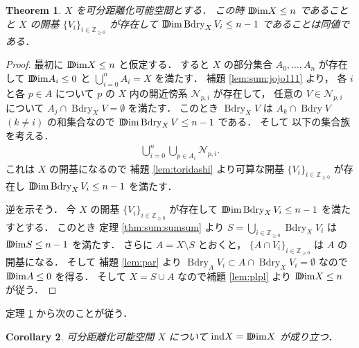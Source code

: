 \documentclass[leqno, a4paper, 12pt]{jsarticle}
\theoremstyle{plain}
\newtheorem{thm}{Theorem}[section]
\newtheorem{cor}[thm]{Corollary}
\theoremstyle{definition}
\theoremstyle{remark}
\newcommand{\zz}{\mathbb{Z}}
\DeclareMathOperator{\bd}{\mathrm{Bdry}}
\newcommand{\yoind}{\mathrm{ind}}
\newcommand{\yoddim}{\mathrm{D\hspace{-5.5pt}Dim}}
\numberwithin{equation}{section}
\begin{document}
\begin{thm}\label{thm:boundary}
$X$
を可分距離化可能空間とする．
この時
$\yoddim X\le n$
であることと
$X$
の開基
$\{V_{i}\}_{i\in \zz_{\ge 0}}$
が存在して
$\yoddim\bd_{X} V_{i}\le n-1$
であることは同値である．
\end{thm}
\begin{proof}
最初に
$\yoddim X\le n$
と仮定する．
すると
$X$
の部分集合
$A_{0}, \dots, A_{n}$
が存在して
$\yoddim A_{i}\le 0$
と
$\bigcup_{i=0}^{n}A_{i}=X$
を満たす．
補題
 \ref{lem:sum:jojo111}
 より，
各
$i$
と各
$p\in A$
について
$p$
の
$X$
内の開近傍系
$\mathcal{N}_{p, i}$
が存在して，
任意の
$V\in \mathcal{N}_{p, i}$
について
$A_{j}\cap \bd_{X} V=\emptyset$
を満たす．
このとき
$\bd_{X}V$
は
$A_{k}\cap \bd V$ 
$(k\neq i)$
の和集合なので
$\yoddim\bd_{X}V\le n-1$
である．
そして
以下の集合族を考える．
\begin{align}
\bigcup_{i=0}^{n}\bigcup_{p\in A_{i}}\mathcal{N}_{p, i}. 
\end{align}
これは
$X$
の開基になるので
補題
\ref{lem:toridashi}
より可算な開基
$\{V_{i}\}_{i\in \zz_{\ge 0}}$
が存在し
$\yoddim\bd_{X} V_{i}\le n-1$
を満たす．

逆を示そう．
今
$X$
の開基
$\{V_{i}\}_{i\in \zz_{\ge 0}}$
が存在して
$\yoddim\bd_{X} V_{i}\le n-1$
を満たすとする．
このとき
定理 
\ref{thm:sum:sumsum}
より
$S=\bigcup_{i\in \zz_{\ge 0}}\bd_{X}V_{i}$
は
$\yoddim S \le n-1$
を満たす．
さらに
$A=X\setminus S$
とおくと，
$\{A\cap V_{i}\}_{i\in \zz_{\ge 0}}$
は
$A$
の開基になる．
そして
補題 
\ref{lem:par}
より
$\bd_{A}V_{i}\subset A\cap \bd_{X}V_{i}=\emptyset$
なので
$\yoddim A\le 0$
を得る．
そして
$X=S\cup A$
なので補題 \ref{lem:plpl}
より
$\yoddim X\le n$
が従う．
\end{proof}


定理
\ref{thm:boundary}
から次のことが従う．
\begin{cor}\label{cor:sum:inddimaaa}
可分距離化可能空間
$X$
について
$\yoind X=\yoddim X$
が成り立つ．
\end{cor}
\end{document}
